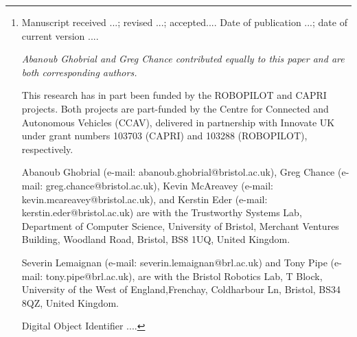 \documentclass[letterpaper, 10 pt, journal, twoside]{IEEEtran}
\begin{document}
\author{Abanoub Ghobrial, Greg Chance, Kevin McAreavey, Severin Lemaignan, Tony Pipe, Kerstin Eder 
\thanks{{\footnotesize
Manuscript  
received ...;
revised ...;  
accepted.... 
Date of publication ...;
date of current version ....

\textit{Abanoub Ghobrial and Greg Chance contributed equally to this paper and are both corresponding authors.}
%

This research has in part been funded by the ROBOPILOT and CAPRI projects. Both projects are part-funded by the Centre for Connected and Autonomous Vehicles (CCAV), delivered in partnership with Innovate UK under grant numbers 103703 (CAPRI) and 103288 (ROBOPILOT), respectively.

Abanoub Ghobrial (e-mail: abanoub.ghobrial@bristol.ac.uk), 
Greg Chance (e-mail: greg.chance@bristol.ac.uk), 
Kevin McAreavey (e-mail: kevin.mcareavey@bristol.ac.uk), 
and 
Kerstin Eder (e-mail: kerstin.eder@bristol.ac.uk) 
are with the Trustworthy Systems Lab, Department of Computer Science, University of Bristol, Merchant Ventures Building, Woodland Road,  Bristol, BS8 1UQ, United Kingdom. 

Severin Lemaignan (e-mail: severin.lemaignan@brl.ac.uk)
and
Tony Pipe (e-mail: tony.pipe@brl.ac.uk), 
are with the Bristol Robotics Lab, T Block, University of the West of England,Frenchay, Coldharbour Ln, Bristol, BS34 8QZ, United Kingdom. 

Digital Object Identifier ....
}}}
%
%
\maketitle
%
\end{document}
